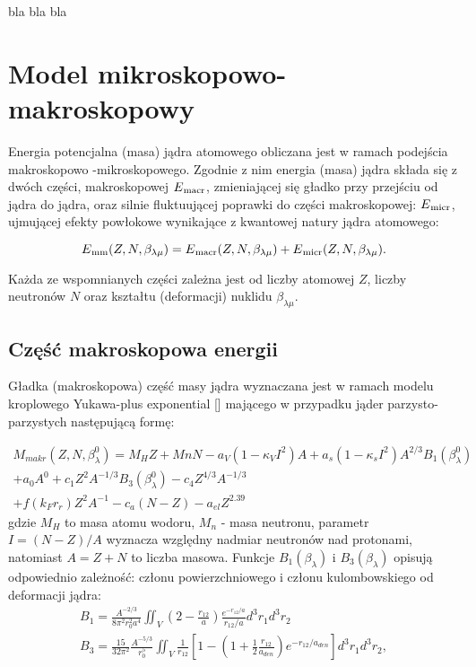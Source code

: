 \documentclass[polish]{article}
\numberwithin{equation}{section}
\begin{document}
bla bla bla


\section{Model mikroskopowo-makroskopowy}


Energia potencjalna (masa) jądra atomowego obliczana jest w ramach podejścia makroskopowo
-mikroskopowego. Zgodnie z nim energia (masa) jądra składa się z dwóch części, makroskopowej $E\textsubscript{macr}$,
zmieniającej się gładko przy przejściu od jądra do jądra, oraz silnie fluktuującej poprawki 
do części makroskopowej: $E\textsubscript{micr}$, ujmującej efekty powłokowe wynikające z kwantowej natury jądra atomowego: 

\begin{equation}
E\textsubscript{mm}(Z,N,\beta_{\lambda \mu}) = E\textsubscript{macr}(Z,N,\beta_{\lambda \mu}) + E\textsubscript{micr}(Z,N,\beta_{\lambda \mu}).
\end{equation}

Każda ze wspomnianych części zależna jest od liczby atomowej $Z$, liczby neutronów $N$ oraz kształtu (deformacji) nuklidu $\beta_{\lambda \mu}$.

\subsection{Część makroskopowa energii}
Gładka (makroskopowa) część masy jądra wyznaczana jest w ramach modelu kroplowego Yukawa-plus exponential [] 
mającego w przypadku jąder parzysto-parzystych następującą formę:

\begin{equation} \label{Eq:Yukawa_model}
\begin{gathered}
M_{makr}(Z,N,\beta^0_{\lambda})=M_{H}Z+M{n}N-a_{V}(1-\kappa_{V}I^2)A+a_{s}(1-\kappa_{s}I^2)A^{2/3}B_{1}(\beta^{0}_{\lambda}) \\
+a_{0}A^{0}+c_{1}Z^{2}A^{-1/3}B_{3}(\beta^{0}_{\lambda})-c_{4}Z^{4/3}A^{-1/3} \\
+f(k_{F}r_{r})Z^{2}A^{-1}-c_{a}(N-Z)-a_{el}Z^{2.39}
\end{gathered}
\end{equation}
gdzie $M_{H}$ to masa atomu wodoru, $M_{n}$ - masa neutronu, parametr $I=(N-Z)/A$ wyznacza względny nadmiar neutronów nad protonami, 
natomiast $A=Z+N$ to liczba masowa.
Funkcje $B_{1}(\beta_{\lambda})$ i $B_{3}(\beta_{\lambda})$ opisują odpowiednio zależność: członu powierzchniowego i członu kulombowskiego
od deformacji jądra:
\begin{gather}
B_{1}=\frac{A^{-2/3}}{8\pi^{2}r^{2}_{0}a^{4}}\iint_V\left(2-\frac{r_{12}}{a}\right)\frac{e^{-r_{12}/a}}{r_{12}/a}d^{3}r_{1}d^{3}r_{2} \\
B_{3}=\frac{15}{32\pi^{2}}\frac{A^{-5/3}}{r^{5}_{0}}\iint_V\frac{1}{r_{12}}\left[1-\left(1+\frac{1}{2}\frac{r_{12}}{a_{den}}\right)e^{-r_{12}/a_{den}}\right]d^{3}r_{1}d^{3}r_{2},
\end{gather}
\end{document}
